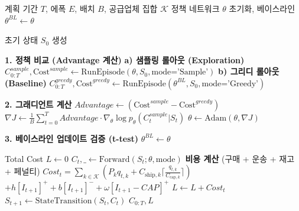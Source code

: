 \documentclass{article}
\begin{document}
\begin{algorithm}[hbt!]
\caption{Greedy Rollout Baseline을 활용한 강화 학습}
\label{alg:reinforce_greedy_sclsp_clean}
\begin{algorithmic}[1]
    \Require 계획 기간 $T$, 에폭 $E$, 배치 $B$, 공급업체 집합 $\mathcal{K}$
    \State 정책 네트워크 $\theta$ 초기화, 베이스라인 $\theta^{BL} \leftarrow \theta$
    
            \State 초기 상태 $S_0$ 생성
            
            \State \textbf{1. 정책 비교 (Advantage 계산)}
            \State \quad \textbf{a) 샘플링 롤아웃 (Exploration)}
            \State \quad $C_{0:T}^{sample}, \text{Cost}^{sample} \leftarrow \text{RunEpisode}(\theta, S_0, \text{mode='Sample'})$
            \State \quad \textbf{b) 그리디 롤아웃 (Baseline)}
            \State \quad $C_{0:T}^{greedy}, \text{Cost}^{greedy} \leftarrow \text{RunEpisode}(\theta^{BL}, S_0, \text{mode='Greedy'})$
            
            \State \textbf{2. 그래디언트 계산}
            \State $Advantage \leftarrow (\text{Cost}^{sample} - \text{Cost}^{greedy})$
            \State $\nabla J \leftarrow \frac{1}{B} \sum_{t=0}^{T} Advantage \cdot \nabla_\theta \log p_\theta(C_t^{sample}|S_t)$
            \State $\theta \leftarrow \text{Adam}(\theta, \nabla J)$
        \EndFor
        
        \State \textbf{3. 베이스라인 업데이트 검증 (t-test)}
            \State $\theta^{BL} \leftarrow \theta$ 
        \EndIf
    \EndFor
    
    \Statex
        \State Total Cost $L \leftarrow 0$
            \State $C_t, \_ \leftarrow \text{Forward}(S_t; \theta, \text{mode})$ 
            \State \textbf{비용 계산} (구매 + 운송 + 재고 + 페널티)
            \State $Cost_t = \sum_{k \in \mathcal{K}} (P_k q_{t,k} + C_{\text{ship}, k} \lceil \frac{q_{t,k}}{C_{\text{cap}, k}} \rceil)$
            \State \quad $+ h[I_{t+1}]^+ + b[I_{t+1}]^- + \omega[I_{t+1} - CAP]^+$
            \State $L \leftarrow L + Cost_t$
            \State $S_{t+1} \leftarrow \text{StateTransition}(S_t, C_t)$ 
        \EndFor
        \State \Return $C_{0:T}, L$
    \EndFunction
\end{algorithmic}
\end{algorithm}
\end{document}
